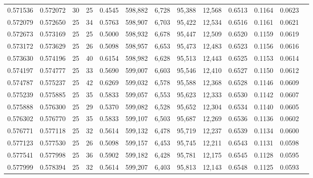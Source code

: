 \begin{tabular}{rrrrrrrrrrrrr}
0.571536 & 0.572072 &    30 &  25 &                                     0.4545 & 598,882 &   6,728 &  95,388 &  12,568 & 0.6513 & 0.1164 & 0.0623 \\
0.572079 & 0.572650 &    25 &  34 &                                     0.5763 & 598,907 &   6,703 &  95,422 &  12,534 & 0.6516 & 0.1161 & 0.0621 \\
0.572673 & 0.573169 &    25 &  25 &                                     0.5000 & 598,932 &   6,678 &  95,447 &  12,509 & 0.6520 & 0.1159 & 0.0619 \\
0.573172 & 0.573629 &    25 &  26 &                                     0.5098 & 598,957 &   6,653 &  95,473 &  12,483 & 0.6523 & 0.1156 & 0.0616 \\
0.573630 & 0.574196 &    25 &  40 &                                     0.6154 & 598,982 &   6,628 &  95,513 &  12,443 & 0.6525 & 0.1153 & 0.0614 \\
0.574197 & 0.574777 &    25 &  33 &                                     0.5690 & 599,007 &   6,603 &  95,546 &  12,410 & 0.6527 & 0.1150 & 0.0612 \\
0.574787 & 0.575237 &    25 &  42 &                                     0.6269 & 599,032 &   6,578 &  95,588 &  12,368 & 0.6528 & 0.1146 & 0.0609 \\
0.575239 & 0.575885 &    25 &  35 &                                     0.5833 & 599,057 &   6,553 &  95,623 &  12,333 & 0.6530 & 0.1142 & 0.0607 \\
0.575888 & 0.576300 &    25 &  29 &                                     0.5370 & 599,082 &   6,528 &  95,652 &  12,304 & 0.6534 & 0.1140 & 0.0605 \\
0.576302 & 0.576770 &    25 &  35 &                                     0.5833 & 599,107 &   6,503 &  95,687 &  12,269 & 0.6536 & 0.1136 & 0.0602 \\
0.576771 & 0.577118 &    25 &  32 &                                     0.5614 & 599,132 &   6,478 &  95,719 &  12,237 & 0.6539 & 0.1134 & 0.0600 \\
0.577123 & 0.577530 &    25 &  26 &                                     0.5098 & 599,157 &   6,453 &  95,745 &  12,211 & 0.6543 & 0.1131 & 0.0598 \\
0.577541 & 0.577998 &    25 &  36 &                                     0.5902 & 599,182 &   6,428 &  95,781 &  12,175 & 0.6545 & 0.1128 & 0.0595 \\
0.577999 & 0.578394 &    25 &  32 &                                     0.5614 & 599,207 &   6,403 &  95,813 &  12,143 & 0.6548 & 0.1125 & 0.0593 \\

\end{tabular}

